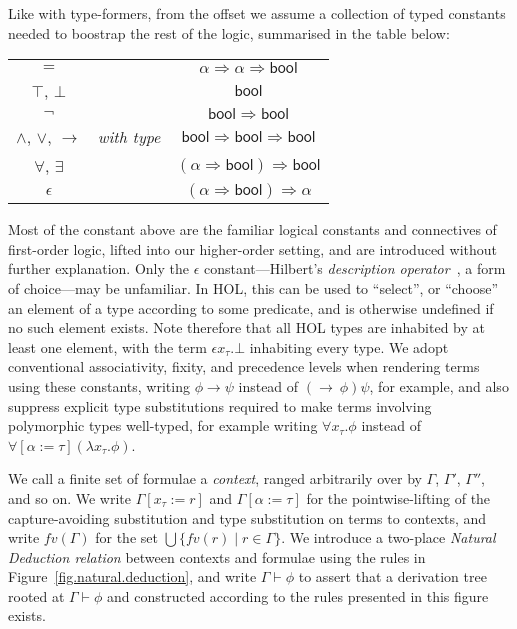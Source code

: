 \documentclass[a4paper, UKenglish, cleveref, autoref, thm-restate, colorlinks]{lipics-v2021}
\newcommand{\eps}[1]{\epsilon{#1}.}
\newcommand{\fall}[1]{\forall{#1}.}
\newcommand{\lam}[1]{\lambda{#1}.}
\begin{document}
Like with type-formers, from the offset we assume a collection of typed constants needed to boostrap the rest of the logic, summarised in the table below:
\begin{center}
\begin{tabular}{ccc}
$=$ & & $\alpha \Rightarrow \alpha \Rightarrow \mathsf{bool}$ \\
$\top$, $\bot$ & & $\mathsf{bool}$ \\
$\neg$ & & $\mathsf{bool} \Rightarrow \mathsf{bool}$ \\
$\wedge$, $\vee$, $\longrightarrow$ & \emph{with type} & $\mathsf{bool} \Rightarrow \mathsf{bool} \Rightarrow \mathsf{bool}$ \\
$\forall$, $\exists$ & & $(\alpha \Rightarrow \mathsf{bool}) \Rightarrow \mathsf{bool}$ \\
$\epsilon$ & & $(\alpha \Rightarrow \mathsf{bool}) \Rightarrow \mathsf{\alpha}$
\end{tabular}
\end{center}
Most of the constant above are the familiar logical constants and connectives of first-order logic, lifted into our higher-order setting, and are introduced without further explanation.
Only the $\epsilon$ constant---Hilbert's \emph{description operator}~\cite{DBLP:conf/csl/MoserZ03}, a form of choice---may be unfamiliar.
In HOL, this can be used to ``select'', or ``choose'' an element of a type according to some predicate, and is otherwise undefined if no such element exists.
Note therefore that all HOL types are inhabited by at least one element, with the term $\eps{x_\tau}\bot$ inhabiting every type.
We adopt conventional associativity, fixity, and precedence levels when rendering terms using these constants, writing $\phi \longrightarrow \psi$ instead of $(\longrightarrow\ \phi)\psi$, for example, and also suppress explicit type substitutions required to make terms involving polymorphic types well-typed, for example writing $\fall{x_\tau}\phi$ instead of $\forall[\alpha := \tau](\lam{x_\tau}\phi)$.

We call a finite set of formulae a \emph{context}, ranged arbitrarily over by $\Gamma$, $\Gamma'$, $\Gamma''$, and so on.
We write $\Gamma[x_\tau := r]$ and $\Gamma[\alpha := \tau]$ for the pointwise-lifting of the capture-avoiding substitution and type substitution on terms to contexts, and write $fv(\Gamma)$ for the set $\bigcup \{ fv(r) \mid r \in \Gamma \}$.
We introduce a two-place \emph{Natural Deduction relation} between contexts and formulae using the rules in Figure~\ref{fig.natural.deduction}, and write $\Gamma \vdash \phi$ to assert that a derivation tree rooted at $\Gamma \vdash \phi$ and constructed according to the rules presented in this figure exists.
\end{document}
